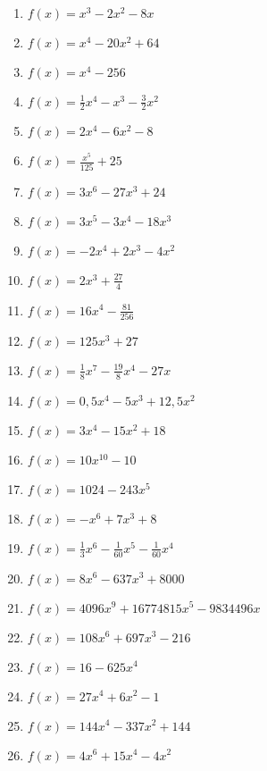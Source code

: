 \begin{Exercise}[title={Berechne die Nullstellen}, label=ganzNSTA1]\\
	\begin{minipage}{\textwidth}
		\begin{minipage}{0.49\textwidth}
			\begin{enumerate}[label=\alph*)]
				\item \(f(x)=x^3-2x^2-8x\)
				\item \(f(x)=x^4-20x^2+64\)
				\item \(f(x)=x^4-256\)
				\item \(f(x)=\frac{1}{2}x^4-x^3-\frac{3}{2}x^2\)
				\item \(f(x)=2x^4-6x^2-8\)
				\item \(f(x)=\frac{x^5}{125}+25\)
				\item \(f(x)=3x^6-27x^3+24\)
				\item \(f(x)=3x^5-3x^4-18x^3\)
				\item \(f(x)=-2x^4+2x^3-4x^2\)
				\item \(f(x)=2x^3+\frac{27}{4}\)
				\item \(f(x)=16x^4-\frac{81}{256}\)
				\item \(f(x)=125x^3+27\)
				\item \(f(x)=\frac{1}{8}x^7-\frac{19}{8}x^4-27x\)
			\end{enumerate}
		\end{minipage}
		\begin{minipage}{0.49\textwidth}
			\begin{enumerate}[label=\alph*)]
				\setcounter{enumi}{13}
				\item \(f(x)=0,5x^4-5x^3+12,5x^2\)
				\item \(f(x)=3x^4-15x^2+18\)
				\item \(f(x)=10x^{10}-10\)
				\item \(f(x)=1024-243x^5\)
				\item \(f(x)=-x^6+7x^3+8\)
				\item \(f(x)=\frac{1}{3}x^6-\frac{1}{60}x^5-\frac{1}{60}x^4\)
				\item \(f(x)=8x^6-637x^3+8000\)
				\item \(f(x)=4096x^9+16774815x^5-9834496x\)
				\item \(f(x)=108x^6+697x^3-216\)
				\item \(f(x)=16-625x^4\)
				\item \(f(x)=27x^4+6x^2-1\)
				\item \(f(x)=144x^4-337x^2+144\)
				\item \(f(x)=4x^6+15x^4-4x^2\)
			\end{enumerate}
		\end{minipage}
	\end{minipage}
\end{Exercise}

